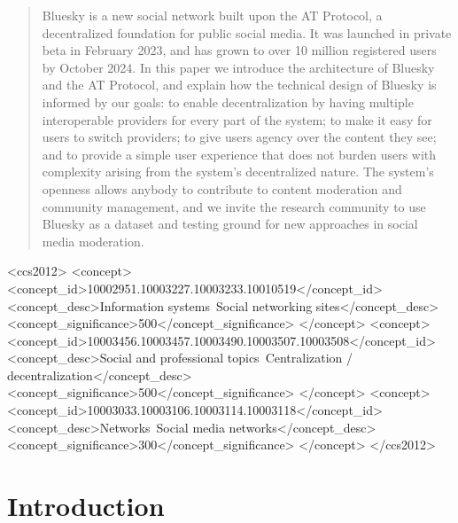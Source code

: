 \documentclass[sigconf]{acmart}
\newif\ifextendedversion
\begin{document}
\begin{abstract}
    Bluesky is a new social network built upon the AT Protocol, a decentralized foundation for public social media.
    It was launched in private beta in February 2023, and has grown to over 10 million registered users by October 2024.
    In this paper we introduce the architecture of Bluesky and the AT Protocol, and explain how the technical design of Bluesky is informed by our goals: to enable decentralization by having multiple interoperable providers for every part of the system; to make it easy for users to switch providers; to give users agency over the content they see; and to provide a simple user experience that does not burden users with complexity arising from the system's decentralized nature.
    The system's openness allows anybody to contribute to content moderation and community management, and we invite the research community to use Bluesky as a dataset and testing ground for new approaches in social media moderation.
\end{abstract}

\begin{CCSXML}
<ccs2012>
   <concept>
       <concept_id>10002951.10003227.10003233.10010519</concept_id>
       <concept_desc>Information systems~Social networking sites</concept_desc>
       <concept_significance>500</concept_significance>
       </concept>
   <concept>
       <concept_id>10003456.10003457.10003490.10003507.10003508</concept_id>
       <concept_desc>Social and professional topics~Centralization / decentralization</concept_desc>
       <concept_significance>500</concept_significance>
       </concept>
   <concept>
       <concept_id>10003033.10003106.10003114.10003118</concept_id>
       <concept_desc>Networks~Social media networks</concept_desc>
       <concept_significance>300</concept_significance>
       </concept>
 </ccs2012>
\end{CCSXML}


\maketitle
\ifextendedversion\newpage\fi

\section{Introduction}\label{sec:introduction}
\end{document}
